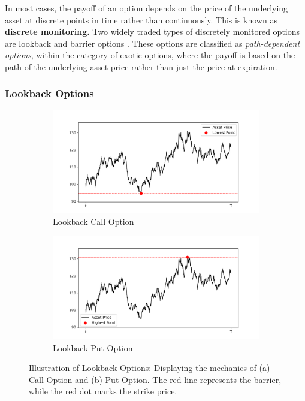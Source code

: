 \documentclass[a4paper]{report}
\begin{document}

In most cases, the payoff of an option depends on the price of the underlying asset at discrete points in time rather than continuously. This is known as \textbf{discrete monitoring.} Two widely traded types of discretely monitored options are lookback and barrier options \citep{dadachanji2015fx}. These options are classified as \textit{path-dependent options}, within the category of exotic options, where the payoff is based on the path of the underlying asset price rather than just the price at expiration.

\subsubsection{Lookback Options}\label{lookback}
\begin{figure}[H]
    \begin{subfigure}{.5\linewidth}
      \includegraphics[width=\linewidth]{images/call_option.png}
      \caption{Lookback Call Option}
      \label{fig:call_option}
    \end{subfigure}\hfill
    \begin{subfigure}{.5\linewidth}
      \includegraphics[width=\linewidth]{images/put_option.png}
      \caption{Lookback Put Option}
      \label{fig:put_option}
    \end{subfigure}
    \caption{Illustration of Lookback Options: Displaying the mechanics of (a) Call Option and (b) Put Option. The red line represents the barrier, while the red dot marks the strike price.}
\end{figure}
\end{document}

